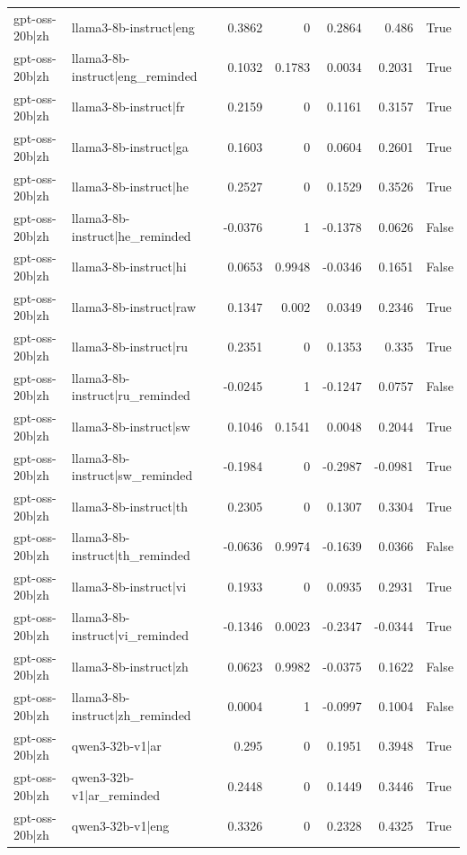 \begin{table}
\begin{tabular}{l l r r r r l}
gpt-oss-20b|zh & llama3-8b-instruct|eng & 0.3862 & 0 & 0.2864 & 0.486 & True \\
gpt-oss-20b|zh & llama3-8b-instruct|eng_reminded & 0.1032 & 0.1783 & 0.0034 & 0.2031 & True \\
gpt-oss-20b|zh & llama3-8b-instruct|fr & 0.2159 & 0 & 0.1161 & 0.3157 & True \\
gpt-oss-20b|zh & llama3-8b-instruct|ga & 0.1603 & 0 & 0.0604 & 0.2601 & True \\
gpt-oss-20b|zh & llama3-8b-instruct|he & 0.2527 & 0 & 0.1529 & 0.3526 & True \\
gpt-oss-20b|zh & llama3-8b-instruct|he_reminded & -0.0376 & 1 & -0.1378 & 0.0626 & False \\
gpt-oss-20b|zh & llama3-8b-instruct|hi & 0.0653 & 0.9948 & -0.0346 & 0.1651 & False \\
gpt-oss-20b|zh & llama3-8b-instruct|raw & 0.1347 & 0.002 & 0.0349 & 0.2346 & True \\
gpt-oss-20b|zh & llama3-8b-instruct|ru & 0.2351 & 0 & 0.1353 & 0.335 & True \\
gpt-oss-20b|zh & llama3-8b-instruct|ru_reminded & -0.0245 & 1 & -0.1247 & 0.0757 & False \\
gpt-oss-20b|zh & llama3-8b-instruct|sw & 0.1046 & 0.1541 & 0.0048 & 0.2044 & True \\
gpt-oss-20b|zh & llama3-8b-instruct|sw_reminded & -0.1984 & 0 & -0.2987 & -0.0981 & True \\
gpt-oss-20b|zh & llama3-8b-instruct|th & 0.2305 & 0 & 0.1307 & 0.3304 & True \\
gpt-oss-20b|zh & llama3-8b-instruct|th_reminded & -0.0636 & 0.9974 & -0.1639 & 0.0366 & False \\
gpt-oss-20b|zh & llama3-8b-instruct|vi & 0.1933 & 0 & 0.0935 & 0.2931 & True \\
gpt-oss-20b|zh & llama3-8b-instruct|vi_reminded & -0.1346 & 0.0023 & -0.2347 & -0.0344 & True \\
gpt-oss-20b|zh & llama3-8b-instruct|zh & 0.0623 & 0.9982 & -0.0375 & 0.1622 & False \\
gpt-oss-20b|zh & llama3-8b-instruct|zh_reminded & 0.0004 & 1 & -0.0997 & 0.1004 & False \\
gpt-oss-20b|zh & qwen3-32b-v1|ar & 0.295 & 0 & 0.1951 & 0.3948 & True \\
gpt-oss-20b|zh & qwen3-32b-v1|ar_reminded & 0.2448 & 0 & 0.1449 & 0.3446 & True \\
gpt-oss-20b|zh & qwen3-32b-v1|eng & 0.3326 & 0 & 0.2328 & 0.4325 & True \\

\end{tabular}
\end{table}
